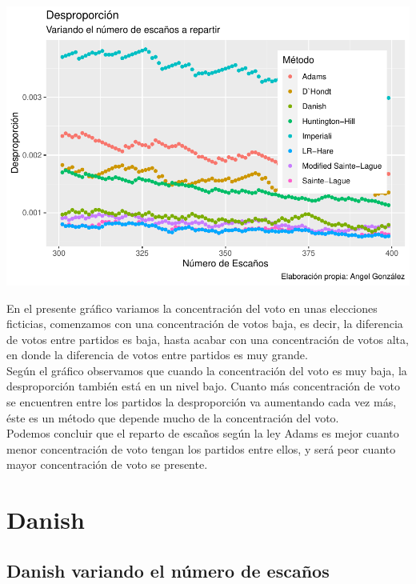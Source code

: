 \documentclass[12pt,a4paper,]{book}
\numberwithin{dummy}{section}
\theoremstyle{ocrenumbox}
\theoremstyle{blacknumex}
\theoremstyle{blacknumbox}
\theoremstyle{ocrenum}
\theoremstyle{ocrenum}
\begin{document}
\begin{center}\includegraphics[width=0.95\linewidth]{figurasR/unnamed-chunk-45-1} \end{center}

En el presente gráfico variamos la concentración del voto en unas
elecciones ficticias, comenzamos con una concentración de votos baja, es
decir, la diferencia de votos entre partidos es baja, hasta acabar con
una concentración de votos alta, en donde la diferencia de votos entre
partidos es muy grande.\\
Según el gráfico observamos que cuando la concentración del voto es muy
baja, la desproporción también está en un nivel bajo. Cuanto más
concentración de voto se encuentren entre los partidos la desproporción
va aumentando cada vez más, éste es un método que depende mucho de la
concentración del voto.\\
Podemos concluir que el reparto de escaños según la ley Adams es mejor
cuanto menor concentración de voto tengan los partidos entre ellos, y
será peor cuanto mayor concentración de voto se presente.

\hypertarget{danish}{%
\section{Danish}\label{danish}}

\hypertarget{danish-variando-el-nuxfamero-de-escauxf1os}{%
\subsection{Danish variando el número de
escaños}\label{danish-variando-el-nuxfamero-de-escauxf1os}}
\end{document}
